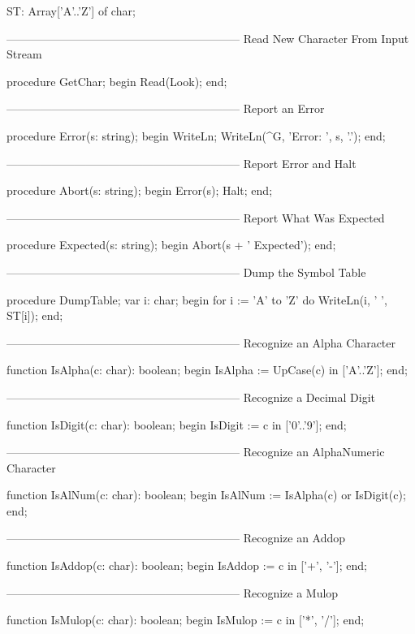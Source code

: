 \documentclass[float=false, crop=false]{standalone}
\begin{document}
    ST: Array['A'..'Z'] of char;


{--------------------------------------------------------------}
{ Read New Character From Input Stream }

procedure GetChar;
begin
   Read(Look);
end;


{--------------------------------------------------------------}
{ Report an Error }

procedure Error(s: string);
begin
   WriteLn;
   WriteLn(^G, 'Error: ', s, '.');
end;


{--------------------------------------------------------------}
{ Report Error and Halt }

procedure Abort(s: string);
begin
   Error(s);
   Halt;
end;


{--------------------------------------------------------------}
{ Report What Was Expected }

procedure Expected(s: string);
begin
   Abort(s + ' Expected');
end;


{--------------------------------------------------------------}
{ Dump the Symbol Table }

procedure DumpTable;
var i: char;
begin
   for i := 'A' to 'Z' do
        WriteLn(i, ' ', ST[i]);
end;


{--------------------------------------------------------------}
{ Recognize an Alpha Character }

function IsAlpha(c: char): boolean;
begin
   IsAlpha := UpCase(c) in ['A'..'Z'];
end;


{--------------------------------------------------------------}
{ Recognize a Decimal Digit }

function IsDigit(c: char): boolean;
begin
   IsDigit := c in ['0'..'9'];
end;


{--------------------------------------------------------------}
{ Recognize an AlphaNumeric Character }

function IsAlNum(c: char): boolean;
begin
   IsAlNum := IsAlpha(c) or IsDigit(c);
end;


{--------------------------------------------------------------}
{ Recognize an Addop }

function IsAddop(c: char): boolean;
begin
   IsAddop := c in ['+', '-'];
end;


{--------------------------------------------------------------}
{ Recognize a Mulop }

function IsMulop(c: char): boolean;
begin
   IsMulop := c in ['*', '/'];
end;
\end{document}
